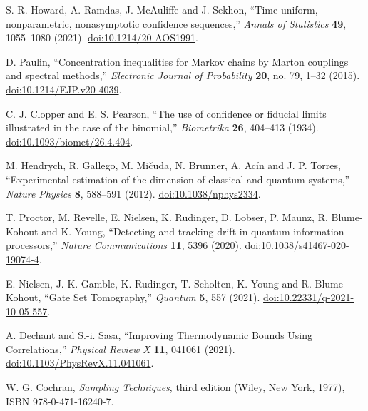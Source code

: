 S. R. Howard, A. Ramdas, J. McAuliffe and J. Sekhon,
``Time-uniform, nonparametric, nonasymptotic confidence sequences,''
\emph{Annals of Statistics} \textbf{49}, 1055--1080 (2021).
\href{https://doi.org/10.1214/20-AOS1991}{doi:10.1214/20-AOS1991}.

D. Paulin,
``Concentration inequalities for Markov chains by Marton couplings and spectral methods,''
\emph{Electronic Journal of Probability} \textbf{20}, no. 79, 1--32 (2015).
\href{https://doi.org/10.1214/EJP.v20-4039}{doi:10.1214/EJP.v20-4039}.

C. J. Clopper and E. S. Pearson,
``The use of confidence or fiducial limits illustrated in the case of the binomial,''
\emph{Biometrika} \textbf{26}, 404--413 (1934).
\href{https://doi.org/10.1093/biomet/26.4.404}{doi:10.1093/biomet/26.4.404}.

M. Hendrych, R. Gallego, M. Mi\v{c}uda, N. Brunner, A. Ac\'in and J. P. Torres,
``Experimental estimation of the dimension of classical and quantum systems,''
\emph{Nature Physics} \textbf{8}, 588--591 (2012).
\href{https://doi.org/10.1038/nphys2334}{doi:10.1038/nphys2334}.

T. Proctor, M. Revelle, E. Nielsen, K. Rudinger, D. Lobser, P. Maunz,
R. Blume-Kohout and K. Young,
``Detecting and tracking drift in quantum information processors,''
\emph{Nature Communications} \textbf{11}, 5396 (2020).
\href{https://doi.org/10.1038/s41467-020-19074-4}{doi:10.1038/s41467-020-19074-4}.

E. Nielsen, J. K. Gamble, K. Rudinger, T. Scholten, K. Young and R. Blume-Kohout,
``Gate Set Tomography,'' \emph{Quantum} \textbf{5}, 557 (2021).
\href{https://doi.org/10.22331/q-2021-10-05-557}{doi:10.22331/q-2021-10-05-557}.

A. Dechant and S.-i. Sasa,
``Improving Thermodynamic Bounds Using Correlations,''
\emph{Physical Review X} \textbf{11}, 041061 (2021).
\href{https://doi.org/10.1103/PhysRevX.11.041061}{doi:10.1103/PhysRevX.11.041061}.

W. G. Cochran, \emph{Sampling Techniques}, third edition
(Wiley, New York, 1977), ISBN 978-0-471-16240-7.
